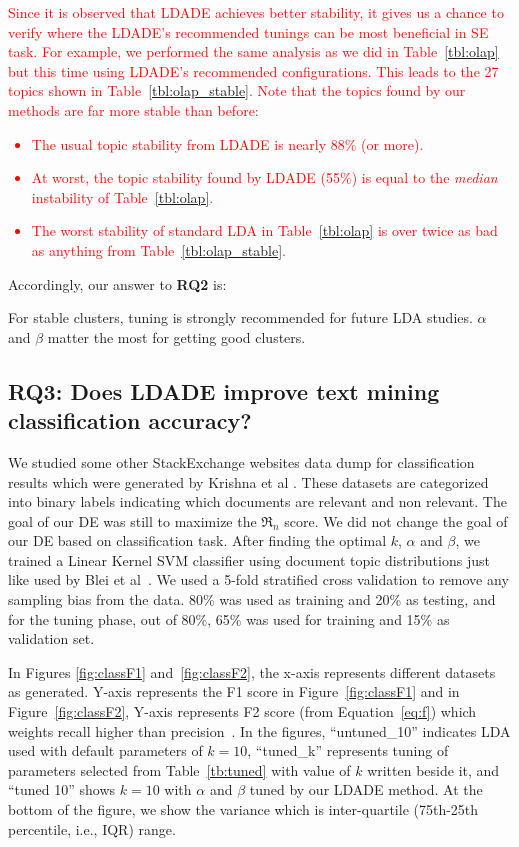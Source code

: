 \documentclass[twocolumn,5p,sort&compress]{elsarticle}
\newcommand{\eq}[1]{Equation~\ref{eq:#1}}
\newcommand{\bi}{\begin{itemize}}
\newcommand{\ei}{\end{itemize}}
\theoremstyle{break}
\begin{document}
  \textcolor{red}{Since it is observed that LDADE achieves better stability, it gives us a chance to verify where the LDADE's recommended tunings can be most beneficial in SE task. For example,
  we performed the same analysis as we did in Table~\ref{tbl:olap} but this time
  using LDADE's recommended
  configurations.
  This leads to the 27   topics shown in Table~\ref{tbl:olap_stable}. Note that
  the topics
  found by our methods are far more stable
  than before:
  \bi
  \item The usual topic stability from LDADE is nearly 88\% (or more).
  \item
  At worst, the   topic stability  
  found by LDADE (55\%) is equal to the {\em
  median} instability of 
  Table~\ref{tbl:olap}.
  \item The worst stability of standard LDA in Table~\ref{tbl:olap} is over twice as bad as anything
  from  Table~\ref{tbl:olap_stable}.
  \ei}
  

  
  Accordingly, our answer to {\bf RQ2} is:

\begin{lesson}
For stable clusters, tuning is strongly recommended for future LDA studies. $\alpha$ and $\beta$ matter the most for getting good clusters.
\end{lesson}

\subsection{\textbf{RQ3: Does LDADE improve text mining classification accuracy?}}\label{sect:rq3} 

We studied some other StackExchange websites data dump for classification results which were generated by Krishna et al \cite{krishna2016bigse}. These datasets are categorized into binary labels indicating which documents are relevant and non relevant. The goal of our DE was still to maximize the $\Re_n$ score. We did not change the goal of our DE based on classification task. After finding the optimal $k$, $\alpha$ and $\beta$, we trained a Linear Kernel SVM classifier using document topic distributions just like used by Blei et al~\cite{blei2003latent}. We used a 5-fold stratified cross validation to remove any sampling bias from the data. 80\% was used as training and 20\% as testing, and for the tuning phase, out of 80\%, 65\% was used for training and 15\% as validation set.


In Figures \ref{fig:classF1} and~\ref{fig:classF2}, the x-axis represents different datasets as generated. Y-axis represents the F1 score in Figure~\ref{fig:classF1} and in Figure~\ref{fig:classF2}, Y-axis represents F2 score
(from \eq{f})  which weights recall higher than precision~\cite{powers2011evaluation}. In the figures, ``untuned\_10'' indicates LDA used with default parameters of $k=10$, ``tuned\_k'' represents tuning of parameters selected from Table~\ref{tb:tuned} with value of $k$ written beside it, and ``tuned 10'' shows $k=10$ with $\alpha$ and $\beta$ tuned by our LDADE method. At the bottom of the figure, we show the variance which is inter-quartile (75th-25th percentile, i.e., IQR) range.
\end{document}
